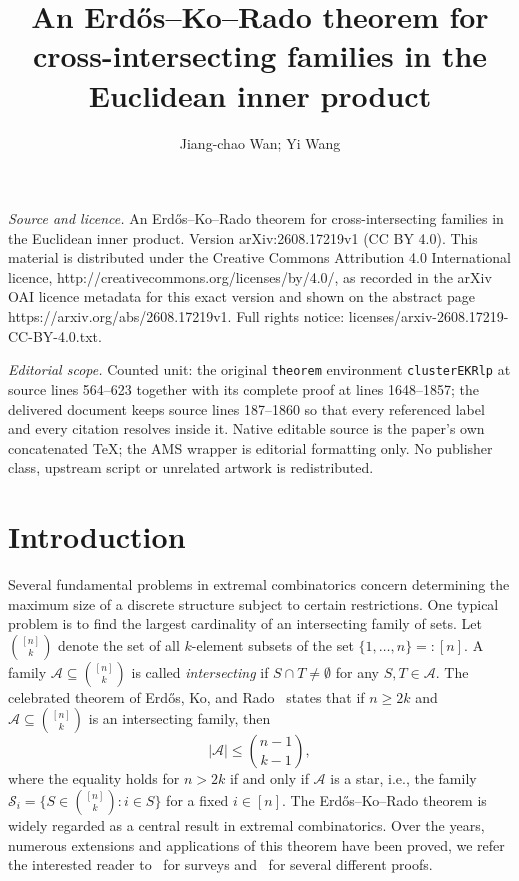 \documentclass[10pt,a4paper]{amsart}
\numberwithin{equation}{section}
\def\A{\mathcal{A}}
\def\S{\mathcal{S}}
\begin{document}
\title[An ErdHos--Ko--Rado theorem for cross-intersecting families ]{An Erd\H{o}s--Ko--Rado theorem for cross-intersecting families in the Euclidean inner product}
\author{Jiang-chao Wan; Yi Wang}
\date{}
\maketitle
\noindent\emph{Source and licence.} An Erd\H{o}s--Ko--Rado theorem for cross-intersecting families in the Euclidean inner product. Version arXiv:2608.17219v1 (CC BY 4.0). This material is distributed under the Creative Commons Attribution 4.0 International licence, http://creativecommons.org/licenses/by/4.0/, as recorded in the arXiv OAI licence metadata for this exact version and shown on the abstract page https://arxiv.org/abs/2608.17219v1. Full rights notice: licenses/arxiv-2608.17219-CC-BY-4.0.txt.\par\smallskip
\noindent\textit{Editorial scope.} Counted unit: the original \texttt{theorem} environment \texttt{clusterEKRlp} at source lines 564--623 together with its complete proof at lines 1648--1857; the delivered document keeps source lines 187--1860 so that every referenced label and every citation resolves inside it. Native editable source is the paper's own concatenated TeX; the AMS wrapper is editorial formatting only. No publisher class, upstream script or unrelated artwork is redistributed.
\section{Introduction}



Several fundamental problems in extremal combinatorics
concern determining the maximum size of a discrete structure
subject to certain restrictions.
One typical problem is to find the largest cardinality of an intersecting family of sets.
Let $\binom{[n]}{k}$ denote the set of all $k$-element subsets of the set
$\{1,\ldots,n\}=:[n]$.
A family $\A \subseteq \binom{[n]}{k}$ is called {\em intersecting} if
$S\cap T\neq \emptyset$ for any $S,T\in \A$.
The celebrated theorem of Erd\H{o}s, Ko, and Rado~\cite{Erdos} states that
if $n\geq 2k$ and $\A \subseteq \binom{[n]}{k}$ is an intersecting family,
then
$$|\A| \leq \binom{n-1}{k-1},$$
where the equality holds for $n>2k$ if and only if $\A$ is a star, i.e., the family $\S_i=\{S\in \binom{[n]}{k}: i\in S\}$ for a fixed $i\in[n]$.
The Erd\H{o}s--Ko--Rado theorem is widely regarded as a central result in extremal combinatorics.
Over the years, numerous extensions and applications of this theorem have been proved, we refer the interested reader to~\cite{Deza,FTsurvey} for surveys and~\cite{Frankl} for several different proofs.
\end{document}
